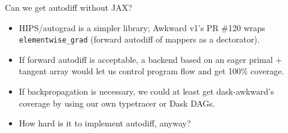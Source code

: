 \documentclass[aspectratio=169]{beamer}
\begin{document}
\begin{frame}{Can we get autodiff without JAX?}
\large
\vspace{0.5 cm}
\begin{itemize}\setlength{\itemsep}{0.5 cm}
\item<1-> HIPS/autograd is a simpler library; Awkward v1's PR \#120 wraps \texttt{elementwise_grad} (forward autodiff of mappers as a dectorator).
\item<2-> If forward autodiff is acceptable, a backend based on an eager primal + tangent array would let us control program flow and get 100\% coverage.
\item<3-> If backpropagation is necessary, we could at least get dask-awkward's coverage by using our own typetracer or Dask DAGs.
\item<4-> How hard is it to implement autodiff, anyway?
\end{itemize}
\end{frame}







\end{document}
